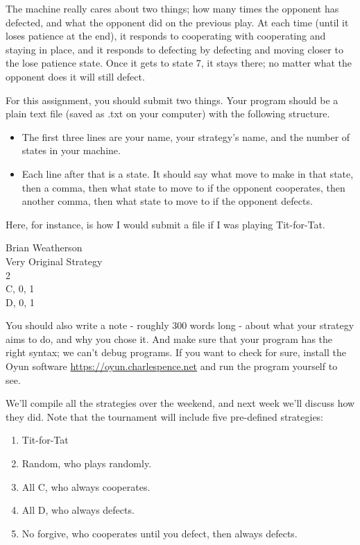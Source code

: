 \documentclass[
  11pt,
]{article}
\providecommand{\tightlist}{%
  \setlength{\itemsep}{0pt}\setlength{\parskip}{0pt}}
\begin{document}
The machine really cares about two things; how many times the opponent
has defected, and what the opponent did on the previous play. At each
time (until it loses patience at the end), it responds to cooperating
with cooperating and staying in place, and it responds to defecting by
defecting and moving closer to the lose patience state. Once it gets to
state 7, it stays there; no matter what the opponent does it will still
defect.

For this assignment, you should submit two things. Your program should
be a plain text file (saved as .txt on your computer) with the following
structure.

\begin{itemize}
\tightlist
\item
  The first three lines are your name, your strategy's name, and the
  number of states in your machine.
\item
  Each line after that is a state. It should say what move to make in
  that state, then a comma, then what state to move to if the opponent
  cooperates, then another comma, then what state to move to if the
  opponent defects.
\end{itemize}

Here, for instance, is how I would submit a file if I was playing
Tit-for-Tat.

Brian Weatherson\\
Very Original Strategy\\
2\\
C, 0, 1\\
D, 0, 1

You should also write a note - roughly 300 words long - about what your
strategy aims to do, and why you chose it. And make sure that your
program has the right syntax; we can't debug programs. If you want to
check for sure, install the Oyun software
\url{https://oyun.charlespence.net} and run the program yourself to see.

We'll compile all the strategies over the weekend, and next week we'll
discuss how they did. Note that the tournament will include five
pre-defined strategies:

\begin{enumerate}
\def\labelenumi{\arabic{enumi}.}
\tightlist
\item
  Tit-for-Tat
\item
  Random, who plays randomly.
\item
  All C, who always cooperates.
\item
  All D, who always defects.
\item
  No forgive, who cooperates until you defect, then always defects.
\end{enumerate}
\end{document}
